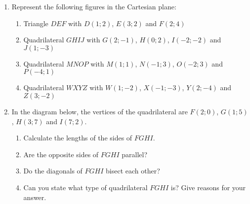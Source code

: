 \begin{eocexercises}{}
  \begin{enumerate}[noitemsep, label=\textbf{\arabic*}. ] 
  \item Represent the following figures in the Cartesian plane: 
    \begin{enumerate}[noitemsep, label=\textbf{(\alph*)} ]
    \item Triangle $DEF$ with $D(1;2)$, $E(3;2)$ and $F(2;4)$ 
    \item Quadrilateral $GHIJ$ with $G(2;-1)$, $H(0;2)$, $I(-2;-2)$ and $J(1;-3)$
    \item Quadrilateral $MNOP$ with $M(1;1)$, $N(-1;3)$, $O(-2;3)$ and $P(-4;1)$ 
    \item Quadrilateral $WXYZ$ with $W(1;-2)$, $X(-1;-3)$, $Y(2;-4)$ and $Z(3;-2)$
    \end{enumerate}
  \item In the diagram below, the vertices of the quadrilateral are $F(2;0)$, $G(1;5)$, $H(3;7)$ and $I(7;2)$.
    \setcounter{subfigure}{0}
    \begin{figure}[H] %
      \begin{center}
      \end{center}
    \end{figure}  
    \begin{enumerate}[noitemsep, label=\textbf{(\alph*)} ]
    \item Calculate the lengths of the  sides of $FGHI$.
    \item Are the opposite sides of $FGHI$ parallel?
    \item Do the diagonals of $FGHI$ bisect each other?
    \item Can you state what type of quadrilateral $FGHI$ is? Give reasons for your answer.
    \end{enumerate}

\end{enumerate}
\end{eocexercises}
